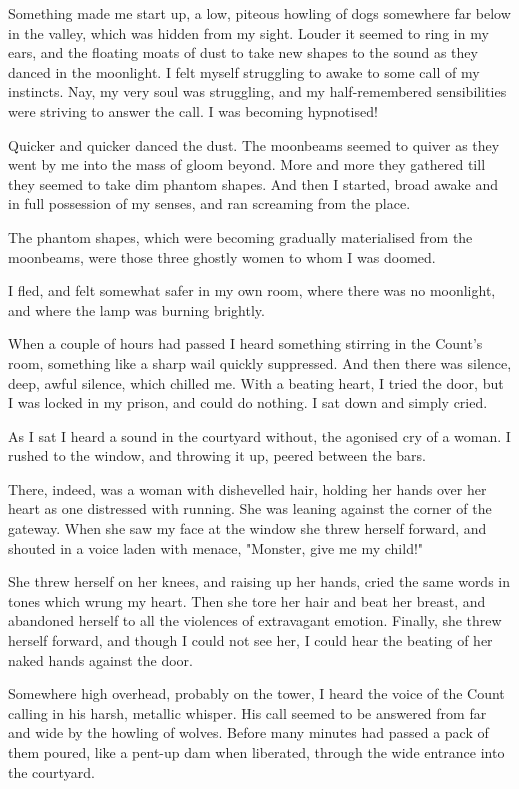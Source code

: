 Something made me start up, a low, piteous howling of dogs somewhere far below in the valley, which was hidden from my sight. Louder it seemed to ring in my ears, and the floating moats of dust to take new shapes to the sound as they danced in the moonlight. I felt myself struggling to awake to some call of my instincts. Nay, my very soul was struggling, and my half-remembered sensibilities were striving to answer the call. I was becoming hypnotised! 

Quicker and quicker danced the dust. The moonbeams seemed to quiver as they went by me into the mass of gloom beyond. More and more they gathered till they seemed to take dim phantom shapes. And then I started, broad awake and in full possession of my senses, and ran screaming from the place. 

The phantom shapes, which were becoming gradually materialised from the moonbeams, were those three ghostly women to whom I was doomed. 

I fled, and felt somewhat safer in my own room, where there was no moonlight, and where the lamp was burning brightly. 

When a couple of hours had passed I heard something stirring in the Count's room, something like a sharp wail quickly suppressed. And then there was silence, deep, awful silence, which chilled me. With a beating heart, I tried the door, but I was locked in my prison, and could do nothing. I sat down and simply cried. 

As I sat I heard a sound in the courtyard without, the agonised cry of a woman. I rushed to the window, and throwing it up, peered between the bars. 

There, indeed, was a woman with dishevelled hair, holding her hands over her heart as one distressed with running. She was leaning against the corner of the gateway. When she saw my face at the window she threw herself forward, and shouted in a voice laden with menace, "Monster, give me my child!" 

She threw herself on her knees, and raising up her hands, cried the same words in tones which wrung my heart. Then she tore her hair and beat her breast, and abandoned herself to all the violences of extravagant emotion. Finally, she threw herself forward, and though I could not see her, I could hear the beating of her naked hands against the door. 

Somewhere high overhead, probably on the tower, I heard the voice of the Count calling in his harsh, metallic whisper. His call seemed to be answered from far and wide by the howling of wolves. Before many minutes had passed a pack of them poured, like a pent-up dam when liberated, through the wide entrance into the courtyard. 

